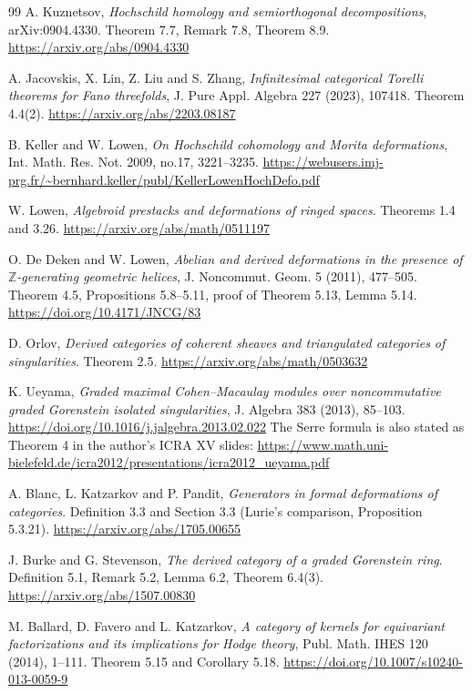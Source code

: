 \documentclass[a4paper,11pt]{ltjsarticle}
\theoremstyle{definition}
\begin{document}
\begin{thebibliography}{99}
A. Kuznetsov,
\emph{Hochschild homology and semiorthogonal decompositions},
arXiv:0904.4330.
Theorem 7.7, Remark 7.8, Theorem 8.9.
\url{https://arxiv.org/abs/0904.4330}

A. Jacovskis, X. Lin, Z. Liu and S. Zhang,
\emph{Infinitesimal categorical Torelli theorems for Fano threefolds},
J. Pure Appl. Algebra 227 (2023), 107418.
Theorem 4.4(2).
\url{https://arxiv.org/abs/2203.08187}

B. Keller and W. Lowen,
\emph{On Hochschild cohomology and Morita deformations},
Int. Math. Res. Not. 2009, no.17, 3221--3235.
\url{https://webusers.imj-prg.fr/~bernhard.keller/publ/KellerLowenHochDefo.pdf}

W. Lowen,
\emph{Algebroid prestacks and deformations of ringed spaces}.
Theorems 1.4 and 3.26.
\url{https://arxiv.org/abs/math/0511197}

O. De Deken and W. Lowen,
\emph{Abelian and derived deformations in the presence of
$\mathbb Z$-generating geometric helices},
J. Noncommut. Geom. 5 (2011), 477--505.
Theorem 4.5, Propositions 5.8--5.11, proof of Theorem 5.13, Lemma 5.14.
\url{https://doi.org/10.4171/JNCG/83}

D. Orlov,
\emph{Derived categories of coherent sheaves and triangulated categories of singularities}.
Theorem 2.5.
\url{https://arxiv.org/abs/math/0503632}

K. Ueyama,
\emph{Graded maximal Cohen--Macaulay modules over noncommutative graded
Gorenstein isolated singularities},
J. Algebra 383 (2013), 85--103.
\url{https://doi.org/10.1016/j.jalgebra.2013.02.022}
The Serre formula is also stated as Theorem 4 in the author's ICRA XV slides:
\url{https://www.math.uni-bielefeld.de/icra2012/presentations/icra2012_ueyama.pdf}

A. Blanc, L. Katzarkov and P. Pandit,
\emph{Generators in formal deformations of categories}.
Definition 3.3 and Section 3.3 (Lurie's comparison, Proposition 5.3.21).
\url{https://arxiv.org/abs/1705.00655}

J. Burke and G. Stevenson,
\emph{The derived category of a graded Gorenstein ring}.
Definition 5.1, Remark 5.2, Lemma 6.2, Theorem 6.4(3).
\url{https://arxiv.org/abs/1507.00830}

M. Ballard, D. Favero and L. Katzarkov,
\emph{A category of kernels for equivariant factorizations and its implications for Hodge theory},
Publ. Math. IHES 120 (2014), 1--111.
Theorem 5.15 and Corollary 5.18.
\url{https://doi.org/10.1007/s10240-013-0059-9}


\end{thebibliography}
\end{document}
